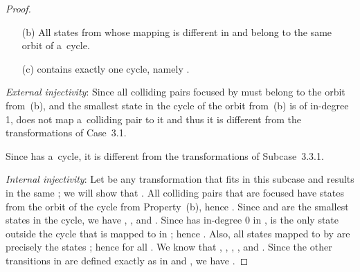 \documentclass{amsart}
\begin{document}
\begin{proof}
\begin{enumerate}
\item[(b)] All states from  whose mapping is different in  and  belong to the same orbit of a~cycle.

\item[(c)]  contains exactly one cycle, namely .
\end{enumerate}

\textit{External injectivity}:
Since all colliding pairs focused by  must belong to the orbit from~(b), and the smallest state in the cycle of the orbit from~(b) is  of in-degree 1,  does not map a~colliding pair to it and thus it is different from the transformations of Case~3.1.

Since  has a~cycle, it is different from the transformations of Subcase~3.3.1.

\textit{Internal injectivity}:
Let  be any transformation that fits in this subcase and results in the same ; we will show that .
All colliding pairs that are focused have states from the orbit of the cycle from Property~(b), hence .
Since  and  are the smallest states in the cycle, we have , , and .
Since  has in-degree 0 in ,  is the only state outside the cycle that is mapped to  in ; hence .
Also, all states mapped to  by  are precisely the states ; hence  for all .
We know that , , , , and .
Since the other transitions in  are defined exactly as in  and , we have .


\end{proof}
\end{document}
